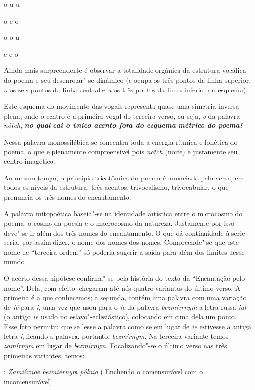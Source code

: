 o u u

o e o

o o u

e e o

Ainda mais surpreendente é observar a totalidade orgânica da estrutura
vocálica do poema e seu desenrolar"-se dinâmico (\emph{e} ocupa os três
pontos da linha superior, \emph{o} os seis pontos da linha central e
\emph{u} os três pontos da linha inferior do esquema):

Este esquema do movimento das vogais representa quase uma simetria
inversa plena, onde o centro é a primeira vogal do terceiro verso, ou
seja, \emph{o} da palavra \emph{nótch, \textbf{no qual cai o único
acento fora do esquema métrico do poema!}}

Nessa palavra monossilábica se concentra toda a energia rítmica e
fonética do poema, o que é plenamente compreensível pois \emph{nótch}
(noite) é justamente seu centro imagético.

Ao mesmo tempo, o princípio tricotômico do poema é anunciado pelo 
verso, em todos os níveis da estrutura: três acentos, trivocalismo,
trivocabular, o que prenuncia os três nomes do encantamento.

A palavra mitopoética baseia"-se na identidade artística entre o
microcosmo do poema, o cosmo da poesia e o macrocosmo da natureza.
Justamente por isso deve"-se ir além dos três nomes do encantamento. O
que dá continuidade à serie seria, por assim dizer, o nome dos nomes dos
nomes. Compreende"-se que este nome de ``terceira ordem'' só poderia
sugerir a saída para além dos limites desse mundo.

O acerto dessa hipótese confirma"-se pela história do texto da
``Encantação pelo nome''. Dela, com efeito, chegaram até nós quatro
variantes do último verso. A primeira é a que conhecemos; a segunda,
contém uma palavra com uma variação de \emph{ié} para \emph{í}, uma vez
que  usou para o \emph{{ie}} da palavra \emph{bezm{íe}rnym} a letra
russa \emph{iat} (o antigo \emph{ie} usado no eslavo"-eclesiástico),
colocando em cima dela um ponto. Esse fato permitiu que se lesse a
palavra como se em lugar de \emph{{ie}} estivesse a antiga letra
\emph{i}, ficando a palavra, portanto, \emph{bezmírnym}. Na terceira
variante temos \emph{zamírnym} em lugar de \emph{bezmírnym}.
Focalizando"-se o último verso nas três primeiras variantes, temos:

 : \emph{Zamiérnoe bezmiérnym pólnia} ( Enchendo o comensurável com o
incomensurável)


